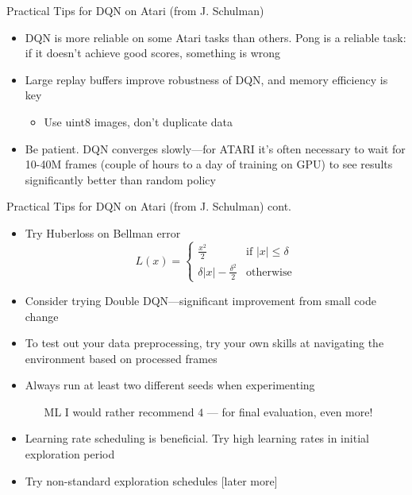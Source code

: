 \begin{frame}[c]{Practical Tips for DQN on Atari (from J. Schulman)}
	
	\begin{itemize}
		\item DQN is more reliable on some Atari tasks than others. Pong is a
		reliable task: if it doesn’t achieve good scores, something is wrong
		\item Large replay buffers improve robustness of DQN, and memory
		efficiency is key
		\begin{itemize}
			\item Use uint8 images, don’t duplicate data
		\end{itemize}
		\item Be patient. DQN converges slowly—for ATARI it’s often necessary to
		wait for 10-40M frames (couple of hours to a day of training on GPU)
		to see results significantly better than random policy
	\end{itemize}
	
\end{frame}
\begin{frame}[c]{Practical Tips for DQN on Atari (from J. Schulman) cont.}
	
	\begin{itemize}
		\item Try Huberloss on Bellman error
		$$L(x) =  \begin{cases}
		\frac{x^2}{2} & \text{if } |x| \leq \delta\\
		\delta |x| - \frac{\delta^2}{2} & \text{otherwise}
		\end{cases}
		$$
		\item Consider trying Double DQN—significant improvement from small
		code change 
		\item To test out your data preprocessing, try your own skills at navigating
		the environment based on processed frames
		\item Always run at least two different seeds when experimenting
		\begin{itemize}
			\item [ML] I would rather recommend $4$ --- for final evaluation, even more!
		\end{itemize}
		\item Learning rate scheduling is beneficial. Try high learning rates in initial
		exploration period
		\item Try non-standard exploration schedules [later more]
	\end{itemize}
	
\end{frame}

